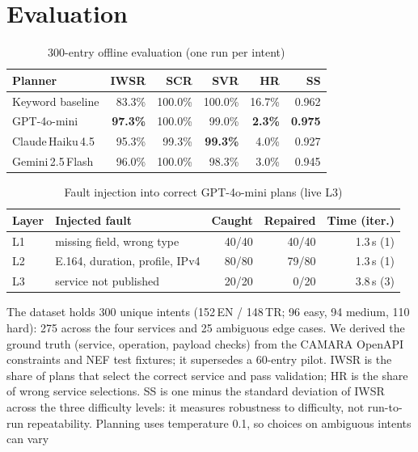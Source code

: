 \documentclass[conference]{IEEEtran}
\begin{document}
\section{Evaluation}
\begin{table}[t]
\centering
\caption{300-entry offline evaluation (one run per intent)}
\label{tab:metrics}
\footnotesize
\setlength{\tabcolsep}{2.6pt}
\begin{tabular}{lrrrrr}
\toprule
\textbf{Planner} & \textbf{IWSR} & \textbf{SCR} & \textbf{SVR} & \textbf{HR} & \textbf{SS} \\
\midrule
Keyword baseline   & 83.3\% & 100.0\% & 100.0\% & 16.7\% & 0.962 \\
GPT-4o-mini        & \textbf{97.3\%} & 100.0\% & 99.0\% & \textbf{2.3\%} & \textbf{0.975} \\
Claude\,Haiku\,4.5 & 95.3\% & 99.3\% & \textbf{99.3\%} & 4.0\% & 0.927 \\
Gemini\,2.5\,Flash & 96.0\% & 100.0\% & 98.3\% & 3.0\% & 0.945 \\
\bottomrule
\end{tabular}
\end{table}
\begin{table}[t]
\centering
\caption{Fault injection into correct GPT-4o-mini plans (live L3)}
\label{tab:faults}
\footnotesize
\setlength{\tabcolsep}{2.6pt}
\begin{tabular}{llrrr}
\toprule
\textbf{Layer} & \textbf{Injected fault} & \textbf{Caught} & \textbf{Repaired} & \textbf{Time (iter.)} \\
\midrule
L1 & missing field, wrong type & 40/40 & 40/40 & 1.3\,s (1) \\
L2 & E.164, duration, profile, IPv4 & 80/80 & 79/80 & 1.3\,s (1) \\
L3 & service not published & 20/20 & 0/20 & 3.8\,s (3) \\
\bottomrule
\end{tabular}
\end{table}
The dataset holds 300 unique intents (152\,EN / 148\,TR; 96 easy, 94 medium, 110 hard):
275 across the four services and 25 ambiguous edge cases. We derived the ground truth
(service, operation, payload checks) from the CAMARA OpenAPI constraints and NEF test
fixtures; it supersedes a 60-entry pilot.
IWSR is the share of plans that select the correct service and pass validation; HR is
the share of wrong service selections. SS is one minus the standard deviation of IWSR
across the three difficulty levels: it measures robustness to difficulty, not run-to-run
repeatability. Planning uses temperature 0.1, so choices on ambiguous intents can vary
\end{document}
